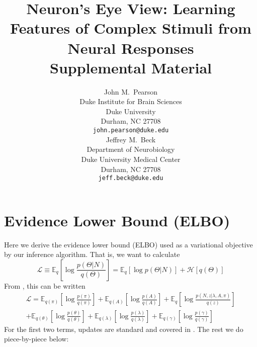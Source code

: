 \documentclass{article} %
\title{Neuron's Eye View: Learning Features of Complex Stimuli from Neural Responses\\Supplemental Material}
\author{
John M.~Pearson\\
Duke Institute for Brain Sciences \\
Duke University\\
Durham, NC 27708 \\
\texttt{john.pearson@duke.edu} \\
\And
Jeffrey M.~Beck \\
Department of Neurobiology \\
Duke University Medical Center \\
Durham, NC 27708 \\
\texttt{jeff.beck@duke.edu} \\
}
\begin{document}
\maketitle

\section{Evidence Lower Bound (ELBO)}
Here we derive the evidence lower bound (ELBO) used as a variational objective by our inference algorithm. That is, we want to calculate
\begin{equation}
    \mathcal{L} \equiv \mathbb{E}_q \left[\log \frac{p(\Theta|N)}{q(\Theta)} \right] = \mathbb{E}_q \left[\log p(\Theta|N) \right] + \mathcal{H}[q(\Theta)]
\end{equation}
From \cite{beal2003variational}, this can be written
\begin{multline}
    \mathcal{L} = \mathbb{E}_{q(\pi)} \left[\log \frac{p(\pi)}{q(\pi)} \right] 
    + \mathbb{E}_{q(A)} \left[\log \frac{p(A)}{q(A)} \right] 
    + \mathbb{E}_{q}\left[ \log \frac{p(N, z|\lambda, A, \pi)}{q(z)}\right] \\ 
    + \mathbb{E}_{q(\theta)} \left[\log \frac{p(\theta)}{q(\theta)} \right] 
    + \mathbb{E}_{q(\lambda)} \left[\log \frac{p(\lambda)}{q(\lambda)} \right] 
    + \mathbb{E}_{q(\gamma)} \left[\log \frac{p(\gamma)}{q(\gamma)} \right] 
\end{multline}
For the first two terms, updates are standard and covered in \cite{beal2003variational}. The rest we do piece-by-piece below:
\end{document}
